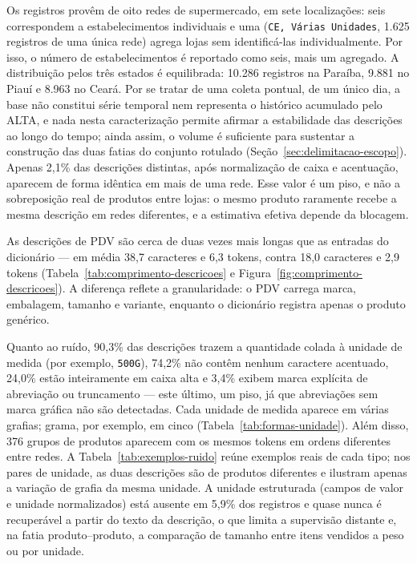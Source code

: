\documentclass[
    article,
    12pt,
    oneside,
    a4paper,
    english,
    brazilian
    ]{abntex2}
\numberwithin{equation}{section}
\begin{document}
Os registros provêm de oito redes de supermercado, em sete localizações: seis correspondem a estabelecimentos individuais e uma (\texttt{CE, Várias Unidades}, 1.625 registros de uma única rede) agrega lojas sem identificá-las individualmente. Por isso, o número de estabelecimentos é reportado como seis, mais um agregado. A distribuição pelos três estados é equilibrada: 10.286 registros na Paraíba, 9.881 no Piauí e 8.963 no Ceará. Por se tratar de uma coleta pontual, de um único dia, a base não constitui série temporal nem representa o histórico acumulado pelo ALTA, e nada nesta caracterização permite afirmar a estabilidade das descrições ao longo do tempo; ainda assim, o volume é suficiente para sustentar a construção das duas fatias do conjunto rotulado (Seção~\ref{sec:delimitacao-escopo}). Apenas 2,1\% das descrições distintas, após normalização de caixa e acentuação, aparecem de forma idêntica em mais de uma rede. Esse valor é um piso, e não a sobreposição real de produtos entre lojas: o mesmo produto raramente recebe a mesma descrição em redes diferentes, e a estimativa efetiva depende da blocagem.

As descrições de PDV são cerca de duas vezes mais longas que as entradas do dicionário --- em média 38,7 caracteres e 6,3 tokens, contra 18,0 caracteres e 2,9 tokens (Tabela~\ref{tab:comprimento-descricoes} e Figura~\ref{fig:comprimento-descricoes}). A diferença reflete a granularidade: o PDV carrega marca, embalagem, tamanho e variante, enquanto o dicionário registra apenas o produto genérico.





Quanto ao ruído, 90,3\% das descrições trazem a quantidade colada à unidade de medida (por exemplo, \texttt{500G}), 74,2\% não contêm nenhum caractere acentuado, 24,0\% estão inteiramente em caixa alta e 3,4\% exibem marca explícita de abreviação ou truncamento --- este último, um piso, já que abreviações sem marca gráfica não são detectadas. Cada unidade de medida aparece em várias grafias; grama, por exemplo, em cinco (Tabela~\ref{tab:formas-unidade}). Além disso, 376 grupos de produtos aparecem com os mesmos tokens em ordens diferentes entre redes. A Tabela~\ref{tab:exemplos-ruido} reúne exemplos reais de cada tipo; nos pares de unidade, as duas descrições são de produtos diferentes e ilustram apenas a variação de grafia da mesma unidade. A unidade estruturada (campos de valor e unidade normalizados) está ausente em 5,9\% dos registros e quase nunca é recuperável a partir do texto da descrição, o que limita a supervisão distante e, na fatia produto--produto, a comparação de tamanho entre itens vendidos a peso ou por unidade.
\end{document}
